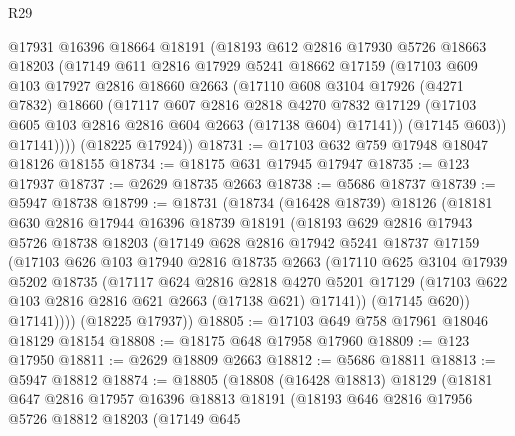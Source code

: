 \begin{lexlean}{R29}
\begin{coremodule}
        @17931
        @16396
        @18664
        @18191
        (@18193
          @612
          @2816
          @17930
          @5726
          @18663
          @18203
          (@17149
            @611
            @2816
            @17929
            @5241
            @18662
            @17159
            (@17103
              @609
              @103
              @17927
              @2816
              @18660
              @2663
              (@17110
                @608
                @3104
                @17926
                (@4271 @7832)
                @18660
                (@17117
                  @607
                  @2816
                  @2818
                  @4270
                  @7832
                  @17129
                  (@17103 @605 @103 @2816 @2816 @604 @2663 (@17138 @604) @17141))
                (@17145 @603))
              @17141))))
      (@18225 @17924))
@18731 := @17103 @632 @759 @17948 @18047 @18126 @18155
@18734 := @18175 @631 @17945 @17947
@18735 := @123 @17937
@18737 := @2629 @18735 @2663
@18738 := @5686 @18737
@18739 := @5947 @18738
@18799 := @18731
    (@18734
      (@16428 @18739)
      @18126
      (@18181
        @630
        @2816
        @17944
        @16396
        @18739
        @18191
        (@18193
          @629
          @2816
          @17943
          @5726
          @18738
          @18203
          (@17149
            @628
            @2816
            @17942
            @5241
            @18737
            @17159
            (@17103
              @626
              @103
              @17940
              @2816
              @18735
              @2663
              (@17110
                @625
                @3104
                @17939
                @5202
                @18735
                (@17117
                  @624
                  @2816
                  @2818
                  @4270
                  @5201
                  @17129
                  (@17103 @622 @103 @2816 @2816 @621 @2663 (@17138 @621) @17141))
                (@17145 @620))
              @17141))))
      (@18225 @17937))
@18805 := @17103 @649 @758 @17961 @18046 @18129 @18154
@18808 := @18175 @648 @17958 @17960
@18809 := @123 @17950
@18811 := @2629 @18809 @2663
@18812 := @5686 @18811
@18813 := @5947 @18812
@18874 := @18805
    (@18808
      (@16428 @18813)
      @18129
      (@18181
        @647
        @2816
        @17957
        @16396
        @18813
        @18191
        (@18193
          @646
          @2816
          @17956
          @5726
          @18812
          @18203
          (@17149
            @645

\end{coremodule}
\end{lexlean}
